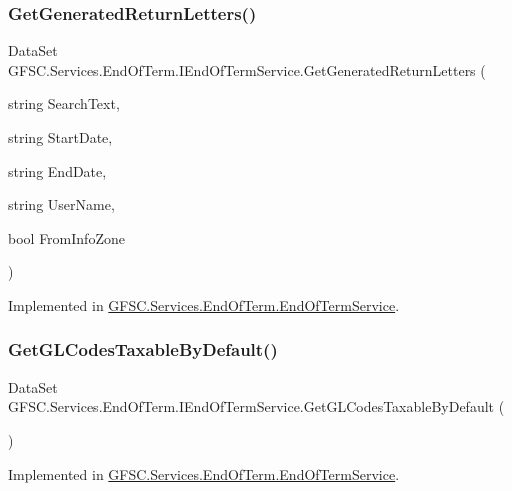 \subsubsection{\texorpdfstring{Get\+Generated\+Return\+Letters()}{GetGeneratedReturnLetters()}}
{\footnotesize\ttfamily Data\+Set G\+F\+S\+C.\+Services.\+End\+Of\+Term.\+I\+End\+Of\+Term\+Service.\+Get\+Generated\+Return\+Letters (\begin{DoxyParamCaption}\item[{string}]{Search\+Text,  }\item[{string}]{Start\+Date,  }\item[{string}]{End\+Date,  }\item[{string}]{User\+Name,  }\item[{bool}]{From\+Info\+Zone }\end{DoxyParamCaption})}



Implemented in \mbox{\hyperlink{class_g_f_s_c_1_1_services_1_1_end_of_term_1_1_end_of_term_service_a2953910fc8e2599fdc524fd411e6bc09}{G\+F\+S\+C.\+Services.\+End\+Of\+Term.\+End\+Of\+Term\+Service}}.

\mbox{\label{interface_g_f_s_c_1_1_services_1_1_end_of_term_1_1_i_end_of_term_service_a8b6ecde00a9c6c73a5d3b1cdb63dd98a}} 
\subsubsection{\texorpdfstring{Get\+G\+L\+Codes\+Taxable\+By\+Default()}{GetGLCodesTaxableByDefault()}}
{\footnotesize\ttfamily Data\+Set G\+F\+S\+C.\+Services.\+End\+Of\+Term.\+I\+End\+Of\+Term\+Service.\+Get\+G\+L\+Codes\+Taxable\+By\+Default (\begin{DoxyParamCaption}{ }\end{DoxyParamCaption})}



Implemented in \mbox{\hyperlink{class_g_f_s_c_1_1_services_1_1_end_of_term_1_1_end_of_term_service_a121a81c4e4bcaa1d9e77609883af1278}{G\+F\+S\+C.\+Services.\+End\+Of\+Term.\+End\+Of\+Term\+Service}}.

